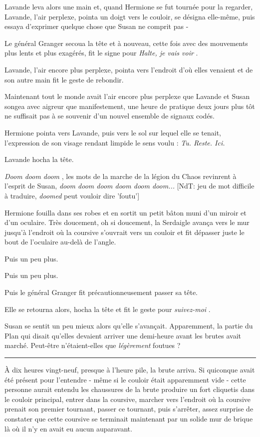 Lavande leva alors une main et, quand Hermione se fut tournée pour la regarder, Lavande, l'air perplexe, pointa un doigt vers le couloir, se désigna elle-même, puis essaya d'exprimer quelque chose que Susan ne comprit pas -

Le général Granger secoua la tête et à nouveau, cette fois avec des mouvements plus lents et plus exagérés, fit le signe pour \emph{Halte, je vais voir} .

Lavande, l'air encore plus perplexe, pointa vers l'endroit d'où elles venaient et de son autre main fit le geste de rebondir.

Maintenant tout le monde avait l'air encore plus perplexe que Lavande et Susan songea avec aigreur que manifestement, une heure de pratique deux jours plus tôt ne suffisait pas à se souvenir d'un nouvel ensemble de signaux codés.

Hermione pointa vers Lavande, puis vers le sol sur lequel elle se tenait, l'expression de son visage rendant limpide le sens voulu : \emph{Tu. Reste. Ici.} 

Lavande hocha la tête.

\emph{Doom doom doom} , les mots de la marche de la légion du Chaos revinrent à l'esprit de Susan, \emph{doom doom doom doom doom doom...}  [NdT: jeu de mot difficile à traduire, \emph{doomed}  peut vouloir dire 'foutu']

Hermione fouilla dans ses robes et en sortit un petit bâton muni d'un miroir et d'un oculaire. Très doucement, oh si doucement, la Serdaigle avança vers le mur jusqu'à l'endroit où la coursive s'ouvrait vers un couloir et fit dépasser juste le bout de l'oculaire au-delà de l'angle.

Puis un peu plus.

Puis un peu plus.

Puis le général Granger fit précautionneusement passer sa tête.

Elle se retourna alors, hocha la tête et fit le geste pour \emph{suivez-moi} .

Susan se sentit un peu mieux alors qu'elle s'avançait. Apparemment, la partie du Plan qui disait qu'elles devaient arriver une demi-heure avant les brutes avait marché. Peut-être n'étaient-elles que \emph{légèrement}  foutues ?
\par\noindent\rule{\textwidth}{0.4pt}
À dix heures vingt-neuf, presque à l'heure pile, la brute arriva. Si quiconque avait été présent pour l'entendre - même si le couloir était apparemment vide - cette personne aurait entendu les chaussures de la brute produire un fort cliquetis dans le couloir principal, entrer dans la coursive, marcher vers l'endroit où la coursive prenait son premier tournant, passer ce tournant, puis s'arrêter, assez surprise de constater que cette coursive se terminait maintenant par un solide mur de brique là où il n'y en avait eu aucun auparavant.

